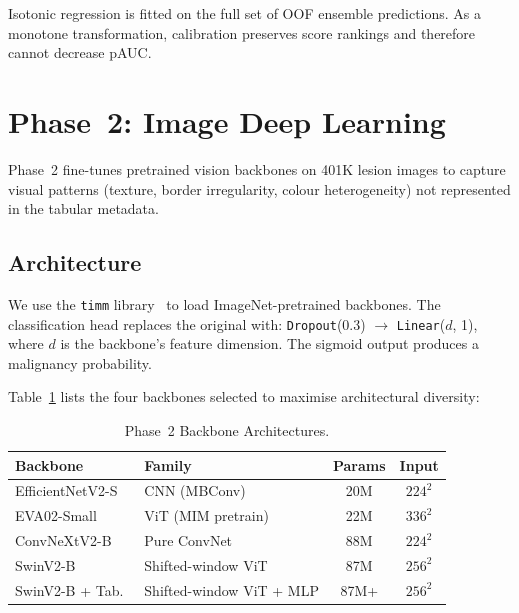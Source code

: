 \documentclass[conference]{IEEEtran}
\begin{document}
Isotonic regression is fitted on the full set of OOF ensemble
predictions.
As a monotone transformation, calibration preserves score rankings and
therefore cannot decrease pAUC.

\section{Phase~2: Image Deep Learning}
\label{sec:phase2}

Phase~2 fine-tunes pretrained vision backbones on 401K lesion images
to capture visual patterns (texture, border irregularity, colour
heterogeneity) not represented in the tabular metadata.

\subsection{Architecture}

We use the \texttt{timm} library~\cite{rw2019timm} to load
ImageNet-pretrained backbones. The classification head replaces the
original with: \texttt{Dropout}(0.3) $\to$ \texttt{Linear}($d$, 1),
where $d$ is the backbone's feature dimension. The sigmoid output
produces a malignancy probability.

Table~\ref{tab:backbones} lists the four backbones selected to
maximise architectural diversity:

\begin{table}[!t]
  \centering
  \caption{Phase~2 Backbone Architectures.}
  \label{tab:backbones}
  \renewcommand{\arraystretch}{1.1}
  \begin{tabular}{llcc}
    \toprule
    \textbf{Backbone} & \textbf{Family} & \textbf{Params} & \textbf{Input} \\
    \midrule
    EfficientNetV2-S & CNN (MBConv) & 20M & $224^2$ \\
    EVA02-Small      & ViT (MIM pretrain) & 22M & $336^2$ \\
    ConvNeXtV2-B     & Pure ConvNet & 88M & $224^2$ \\
    SwinV2-B         & Shifted-window ViT & 87M & $256^2$ \\
    SwinV2-B + Tab.\ & Shifted-window ViT + MLP & 87M+ & $256^2$ \\
    \bottomrule
  \end{tabular}
\end{table}
\end{document}
